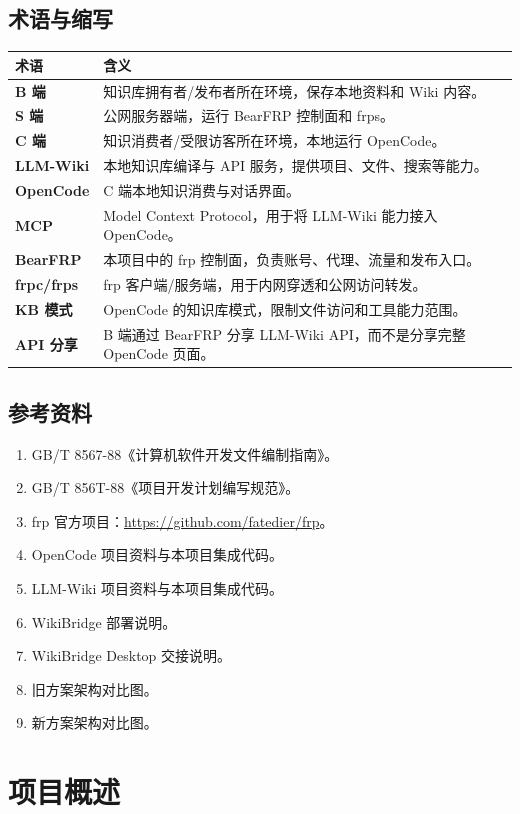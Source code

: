 \documentclass[UTF8,a4paper,12pt,fontset=fandol]{ctexart}
\begin{document}
\subsection{术语与缩写}
\begin{longtable}{>{\bfseries}p{3.2cm}p{11.0cm}}
\toprule
术语 & 含义 \\
\midrule
B 端 & 知识库拥有者/发布者所在环境，保存本地资料和 Wiki 内容。 \\
S 端 & 公网服务器端，运行 BearFRP 控制面和 frps。 \\
C 端 & 知识消费者/受限访客所在环境，本地运行 OpenCode。 \\
LLM-Wiki & 本地知识库编译与 API 服务，提供项目、文件、搜索等能力。 \\
OpenCode & C 端本地知识消费与对话界面。 \\
MCP & Model Context Protocol，用于将 LLM-Wiki 能力接入 OpenCode。 \\
BearFRP & 本项目中的 frp 控制面，负责账号、代理、流量和发布入口。 \\
frpc/frps & frp 客户端/服务端，用于内网穿透和公网访问转发。 \\
KB 模式 & OpenCode 的知识库模式，限制文件访问和工具能力范围。 \\
API 分享 & B 端通过 BearFRP 分享 LLM-Wiki API，而不是分享完整 OpenCode 页面。 \\
\bottomrule
\end{longtable}

\subsection{参考资料}
\begin{enumerate}
  \item GB/T 8567-88《计算机软件开发文件编制指南》。
  \item GB/T 856T-88《项目开发计划编写规范》。
  \item frp 官方项目：\url{https://github.com/fatedier/frp}。
  \item OpenCode 项目资料与本项目集成代码。
  \item LLM-Wiki 项目资料与本项目集成代码。
  \item WikiBridge 部署说明。
  \item WikiBridge Desktop 交接说明。
  \item 旧方案架构对比图。
  \item 新方案架构对比图。
\end{enumerate}

\section{项目概述}
\end{document}
